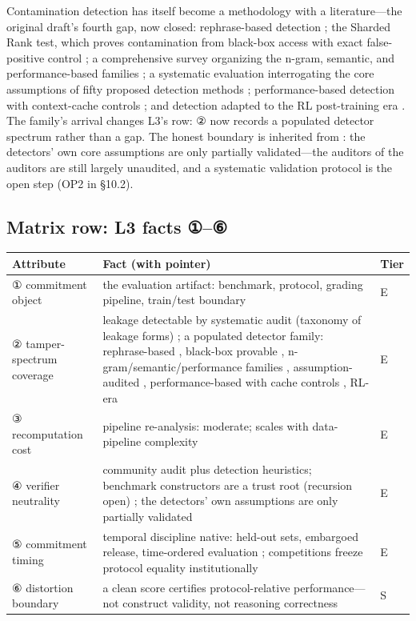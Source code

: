 \documentclass[11pt,a4paper]{article}
\begin{document}
Contamination detection has itself become a methodology with a literature—the original draft's fourth gap, now closed: rephrase-based detection \cite{key32}; the Sharded Rank test, which proves contamination from black-box access with exact false-positive control \cite{key33}; a comprehensive survey organizing the n-gram, semantic, and performance-based families \cite{key34}; a systematic evaluation interrogating the core assumptions of fifty proposed detection methods \cite{key35}; performance-based detection with context-cache controls \cite{key36}; and detection adapted to the RL post-training era \cite{key37}. The family's arrival changes L3's row: ② now records a populated detector spectrum rather than a gap. The honest boundary is inherited from \cite{key35}: the detectors' own core assumptions are only partially validated—the auditors of the auditors are still largely unaudited, and a systematic validation protocol is the open step (OP2 in §10.2).

\subsection{Matrix row: L3 facts ①–⑥}

\begin{table}[htbp]
\centering
\footnotesize
\setlength{\tabcolsep}{3.5pt}
\renewcommand{\arraystretch}{1.18}
\begin{tabularx}{0.985\textwidth}{>{\raggedright\arraybackslash}p{} >{\raggedright\arraybackslash}X >{\raggedright\arraybackslash}p{}}
\toprule
\textbf{Attribute} & \textbf{Fact (with pointer)} & \textbf{Tier} \\
\midrule
① commitment object & the evaluation artifact: benchmark, protocol, grading pipeline, train\slash test boundary \cite{key07,key08} & E \\
② tamper-spectrum coverage & leakage detectable by systematic audit (taxonomy of leakage forms) \cite{key07}; a populated detector family: rephrase-based \cite{key32}, black-box provable \cite{key33}, n-gram\slash semantic\slash performance families \cite{key34}, assumption-audited \cite{key35}, performance-based with cache controls \cite{key36}, RL-era \cite{key37} & E \\
③ recomputation cost & pipeline re-analysis: moderate; scales with data-pipeline complexity \cite{key07} & E \\
④ verifier neutrality & community audit plus detection heuristics; benchmark constructors are a trust root (recursion open) \cite{key07,key08}; the detectors' own assumptions are only partially validated \cite{key35} & E \\
⑤ commitment timing & temporal discipline native: held-out sets, embargoed release, time-ordered evaluation \cite{key07,key08}; competitions freeze protocol equality institutionally \cite{key31} & E \\
⑥ distortion boundary & a clean score certifies protocol-relative performance—not construct validity, not reasoning correctness & S \\
\bottomrule
\end{tabularx}
\end{table}
\end{document}
